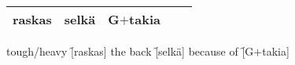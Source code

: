 \begin{center}
  \begin{tabular}{|c c c c c|}
    \hline
      raskas & selkä & G$+$takia && \\
    \hline
  \end{tabular}
\end{center}

\begin{questions}
  \begin{multicols}{3}
    \raggedcolumns
    \question tough/heavy \f[raskas]
    \question the back    \f[selkä]
    \question because of      \f[G$+$takia]
  \end{multicols}
\end{questions}
